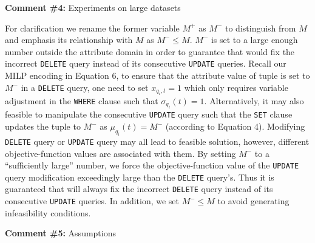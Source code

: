 

\comskip

\noindent
\textbf{Comment \#4:} Experiments on large datasets
\begin{quote}
\end{quote}


For clarification we rename the former variable $M^+$ as $M^-$ to distinguish
from $M$ and emphasis its relationship with $M$ as $M^- \leq M$. $M^-$ is set
to a large enough number outside the attribute domain in order to guarantee
that \sys would fix the incorrect \texttt{DELETE} query instead of its
consecutive \texttt{UPDATE} queries. Recall our MILP encoding in Equation 6,
to ensure that the attribute value of tuple is set to $M^-$ in a
\texttt{DELETE} query, one need to set $x_{q_i,t} = 1$ which only requires
variable adjustment in the \texttt{WHERE} clause such that $\sigma_{q_i}(t) =
1$. Alternatively, it may also feasible to manipulate the consecutive
\texttt{UPDATE} query such that the \texttt{SET} clause updates the tuple to
$M^-$ as $\mu_{q_i}(t) = M^-$ (according to Equation 4). Modifying
\texttt{DELETE} query or \texttt{UPDATE} query may all lead to feasible
solution, however, different objective-function values are associated with
them. By setting $M^-$ to a ``sufficiently large'' number, we force the
objective-function value of the \texttt{UPDATE} query modification exceedingly
large than the \texttt{DELETE} query's. Thus it is guaranteed that \sys will
always fix the incorrect \texttt{DELETE} query instead of its consecutive
\texttt{UPDATE} queries. In addition, we set $M^- \leq M$ to avoid generating
infeasibility conditions.


\comskip

\noindent
\textbf{Comment \#5:} Assumptions
\begin{quote}
\end{quote}

